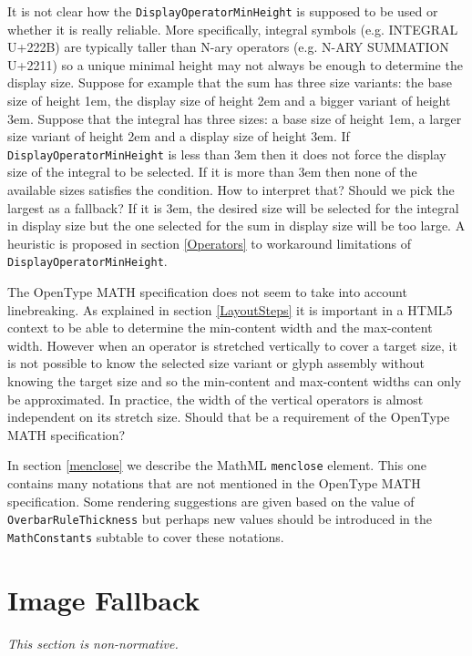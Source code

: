 It is not clear how the {\tt DisplayOperatorMinHeight} is
supposed to be used or whether it is really reliable. More specifically,
integral symbols (e.g. INTEGRAL U+222B) are typically taller than N-ary
operators (e.g. N-ARY SUMMATION U+2211) so a unique minimal height may not
always be enough to determine the display size. Suppose for example that the
sum has three size variants: the base size of height 1em, the display size
of height 2em and a bigger variant of height 3em.
Suppose that the integral has three sizes: a base size of
height 1em, a larger size variant of height 2em and a display size of height
3em. If {\tt DisplayOperatorMinHeight} is less than
3em then it does not force the display size of the integral to be selected.
If it is more than 3em then none of the available sizes satisfies the
condition. How to interpret that? Should we pick the largest as a fallback?
If it is 3em, the desired size will be selected for the integral in display
size but the one selected for the sum in display size will be too large.
A heuristic is proposed in section \ref{Operators} to workaround limitations
of {\tt DisplayOperatorMinHeight}.

The OpenType MATH specification does not seem to take into account
linebreaking. As explained in section \ref{LayoutSteps} it is important in a
HTML5 context to be able to determine the min-content width and the max-content
width. However when an operator is stretched vertically to cover a target size,
it is not possible to know the selected size variant or glyph assembly without
knowing the target size and so the min-content and max-content widths can only
be approximated. In practice, the width of the vertical operators is almost
independent on its stretch size. Should that be a requirement of the
OpenType MATH specification?

In section \ref{menclose} we describe the MathML {\tt menclose} element. This
one contains many notations that are not mentioned in the OpenType MATH
specification. Some rendering suggestions are given based on the value of
{\tt OverbarRuleThickness} but perhaps new values should be
introduced in the {\tt MathConstants} subtable to cover these
notations.

\section{Image Fallback}\label{ImageFallback}

{\em This section is non-normative.}

